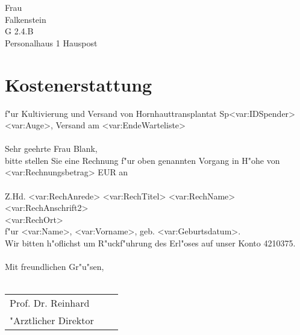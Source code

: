 \documentclass[a4]{scrreprt}
\begin{document}
\noindent Frau \\
\noindent Falkenstein \\
\noindent G 2.4.B \\
\noindent Personalhaus 1
\noindent Hauspost


\setcounter{secnumdepth}{0}
\section{Kostenerstattung}
f"ur Kultivierung und Versand von Hornhauttransplantat Sp<var:IDSpender><var:Auge>, Versand am <var:EndeWarteliste> \\ \\


\noindent Sehr geehrte Frau Blank, \\

\noindent bitte stellen Sie eine Rechnung f"ur oben genannten Vorgang in H"ohe von <var:Rechnungsbetrag> EUR an \\

\\Z.Hd. <var:RechAnrede> <var:RechTitel> <var:RechName>\\<var:RechAnschrift1> <var:RechAnschrift2>\\<var:RechPLZ> <var:RechOrt> \\

\noindent f"ur <var:Name>, <var:Vorname>, geb. <var:Geburtsdatum>. \\ 

\noindent Wir bitten h"oflichst um R"uckf"uhrung des Erl"oses auf unser Konto 4210375. \\ \\



\noindent Mit freundlichen Gr"u"sen, \\ \\ 

\noindent \begin{tabular}{lp{8cm}l}
Prof. Dr. Reinhard & & \\ 
"Arztlicher Direktor & & \\ 
\end{tabular}
\end{document}
